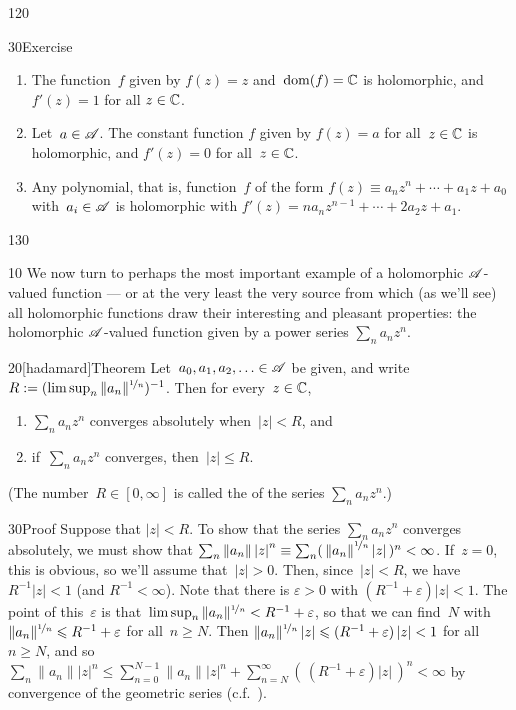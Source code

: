 \begin{parsec}{120}
\begin{point}{30}{Exercise}
\begin{enumerate}
\item
The function~$f$ given by $f(z)=z$ and~$\dom(f)=\C$
is holomorphic, and $f'(z)=1$ for all $z\in\C$.

\item
Let~$a\in \scrA$. The constant function $f$ given by $f(z)=a$
for all~$z\in \C$ is holomorphic, and $f'(z)=0$ for all~$z\in \C$.

\item
Any polynomial,
that is, function~$f$ of the form $f(z)\equiv a_n z^n+\dotsb+a_1 z+a_0$
with~$a_i\in \scrA$
is holomorphic with $f'(z)=na_nz^{n-1}+\dotsb+2a_2z+a_1$.
\end{enumerate}%
\spacingfix{}%
\end{point}%
\end{parsec}%
\begin{parsec}{130}%
\begin{point}{10}%
We now turn
to perhaps the most important example
of a holomorphic $\scrA$-valued function ---
or at the very least the very source from
which (as we'll see) all holomorphic functions
draw their interesting and pleasant
properties:
the holomorphic $\scrA$-valued function
given by a power series  $\sum_n a_n z^n$.
\end{point}
\begin{point}{20}[hadamard]{Theorem}%
%
Let~$a_0,a_1,a_2,\dotsc\in\scrA$
be given,
and write~$R:=(\limsup_n \|a_n\|^{\nicefrac{1}{n}})^{-1}$.
Then for every~$z\in\C$,
\begin{enumerate}
\item
$\sum_n a_n z^n$
converges absolutely
when~$\left|z\right| < R$, and 
\item
if~$\sum_n a_n z^n$ converges,
then~$\left|z\right|\leq R$.
\end{enumerate}
(The number~$R\in[0,\infty]$ is called the %
of the series $\sum_n a_n z^n$.)
\begin{point}{30}{Proof}%
Suppose that $\left|z\right|<R$.
To show that the series 
$\sum_n a_nz^n$ converges absolutely,
we must show that $\sum_n \left\|a_n\right\|\left|z\right|^n
\equiv \sum_n (\,\left\|a_n\right\|^{\nicefrac{1}{n}}\left|z\right|\,)^n
<\infty$.
If~$z=0$, this is obvious,
so we'll assume that~$\left|z\right| > 0$.
Then, since~$\left|z\right|<R$,
we have~$R^{-1}\left|z\right|<1$
(and $R^{-1}<\infty$).
Note that
there is $\varepsilon>0$ with $(R^{-1}+\varepsilon)\left|z\right|<1$.
The point of this~$\varepsilon$
is that~$\limsup_n \|a_n\|^{\nicefrac{1}{n}} 
< R^{-1}+\varepsilon$,
so that we can find~$N$ 
with $\|a_n\|^{\nicefrac{1}{n}} \leq R^{-1}+\varepsilon$
for all~$n\geq N$.
Then $\|a_n\|^{\nicefrac{1}{n}}\left|z\right|
\leq (R^{-1}+\varepsilon)\left|z\right|<1$
for all~$n\geq N$,
and so
$\sum_n \|a_n\|\left|z\right|^n 
\leq\sum_{n=0}^{N-1} \|a_n\|\left|z\right|^n+ \sum_{n=N}^\infty 
(\,(R^{-1}+\varepsilon)\left|z\right|\,)^n < \infty$
by  convergence
of the geometric series (c.f.~).


\end{point}
\end{point}
\end{parsec}
